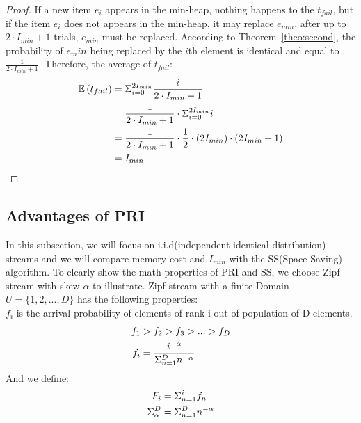 \begin{proof}
   If a new item $e_i$ appears in the min-heap, nothing happens to the $t_{fail}$, but if the item $e_i$ does not appears in the min-heap, it may replace $e_{min}$, after up to $2\cdot I_{min}+1$ trials, $e_{min}$ must be replaced. According to Theorem~\ref{theo:second}, the probability of $e_min$ being replaced by the $i$th element is identical and equal to $\frac{1}{2\cdot I_{min}+1}$.
   Therefore, the average of $t_{fail}$:
\begin{equation}
\begin{aligned}
\centering  
\mathbb{E}\left(t_{fail}\right) &= \Sigma_{i=0}^{2I_{min}}{\frac{i}{2\cdot I_{min}+1}} \\
&= \frac{1}{2\cdot I_{min}+1} \cdot \Sigma_{i=0}^{2I_{min}}i \\
&= \frac{1}{2\cdot I_{min}+1} \cdot \frac{1}{2} \cdot \left({2I_{min}}\right) \cdot \left({2I_{min}+1}\right)\\
&= I_{min}
\end{aligned}
\end{equation}   
\end{proof}

\presub
\subsection{Advantages of PRI}
\postsub

In this subsection, we will focus on i.i.d(independent identical distribution) streams and we will compare memory cost and $I_{min}$ with the SS(Space Saving) algorithm.
To clearly show the math properties of PRI and SS, we choose Zipf stream with skew $\alpha$ to illustrate. Zipf stream with a finite Domain $U = \{1, 2, ..., D\}$ has the following properties:\\

$f_i$ is the arrival probability of elements of rank i out of population of D elements.
\begin{equation}
\begin{aligned}
\centering  
f_1 &> f_2 > f_3 > ... > f_D \\ 
f_i &= \frac{i^{-\alpha}}{\Sigma_{n=1}^D{n^{-\alpha}}}
\end{aligned}
\end{equation}
And we define:
\begin{equation}
\begin{aligned}
\centering  
F_i &= \Sigma_{n=1}^i{f_n}\\
\Sigma_\alpha^D &= \Sigma_{n=1}^D{n^{-\alpha}}
\end{aligned}
\end{equation}


